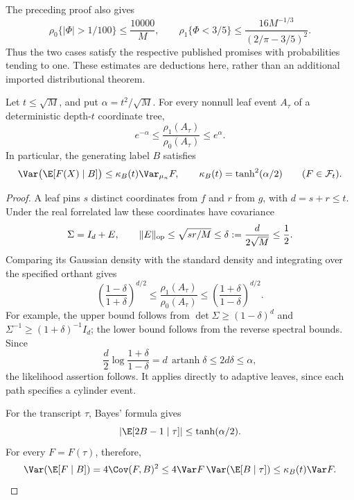 \begin{remark}\label{ian:forrelation-promise-mass}
The preceding proof also gives
\[
 \rho_0\{|\Phi|>1/100\}\le\frac{10000}{M},
 \qquad
 \rho_1\{\Phi<3/5\}
 \le\frac{16M^{-1/3}}{(2/\pi-3/5)^2}.
\]
Thus the two cases satisfy the respective published promises with probabilities tending to one. These estimates are deductions here, rather than an additional imported distributional theorem.
\end{remark}

\begin{lemma}\label{ian:forrelation-adaptive-hiding}
Let \(t\le\sqrt M\), and put \(\alpha=t^2/\sqrt M\). For every nonnull leaf event \(A_\tau\) of a deterministic depth-\(t\) coordinate tree,
\[
 e^{-\alpha}\le
 \frac{\rho_1(A_\tau)}{\rho_0(A_\tau)}
 \le e^\alpha.
\]
In particular, the generating label \(B\) satisfies
\[
 \Var\bigl(\E[F(X)\mid B]\bigr)
 \le\kappa_B(t)\Var_{\mu_n}F,
 \qquad
 \kappa_B(t)=\tanh^2(\alpha/2)
 \qquad(F\in\mathcal F_t).
\]
\end{lemma}
\begin{proof}
A leaf pins \(s\) distinct coordinates from \(f\) and \(r\) from \(g\), with \(d=s+r\le t\). Under the real forrelated law these coordinates have covariance
\[
 \Sigma=I_d+E,\qquad
 \|E\|_{\rm op}\le\sqrt{sr/M}\le\delta:=\frac d{2\sqrt M}\le\frac12.
\]
Comparing its Gaussian density with the standard density and integrating over the specified orthant gives
\[
 \left(\frac{1-\delta}{1+\delta}\right)^{d/2}
 \le
 \frac{\rho_1(A_\tau)}{\rho_0(A_\tau)}
 \le
 \left(\frac{1+\delta}{1-\delta}\right)^{d/2}.
\]
For example, the upper bound follows from
\(\det\Sigma\ge(1-\delta)^d\) and
\(\Sigma^{-1}\ge(1+\delta)^{-1}I_d\); the lower bound follows from the reverse spectral bounds. Since
\[
 \frac d2\log\frac{1+\delta}{1-\delta}
 =d\,\operatorname{artanh}\delta
 \le2d\delta\le\alpha,
\]
the likelihood assertion follows. It applies directly to adaptive leaves, since each path specifies a cylinder event.

For the transcript \(\tau\), Bayes' formula gives
\[
 \left|\E[2B-1\mid\tau]\right|\le\tanh(\alpha/2).
\]
For every \(F=F(\tau)\), therefore,
\[
 \Var(\E[F\mid B])
 =4\Cov(F,B)^2
 \le4\Var F\,\Var(\E[B\mid\tau])
 \le\kappa_B(t)\Var F.
\]
\end{proof}

